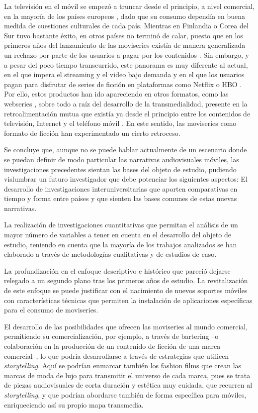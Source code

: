 \documentclass[spanish]{textolivre}
\begin{document}
La televisión en el móvil se empezó a truncar desde el principio, a nivel comercial, en la mayoría de los países europeos \cite{feijoo2010}, dado que su consumo dependía en buena medida de cuestiones culturales de cada país. Mientras en Finlandia o Corea del Sur tuvo bastante éxito, en otros países no terminó de calar, puesto que en los primeros años del lanzamiento de las moviseries existía de manera generalizada un rechazo por parte de los usuarios a pagar por los contenidos \cite{saez2010, urban2007}. Sin embargo, y a pesar del poco tiempo transcurrido, este panorama es muy diferente al actual, en el que impera el streaming y el video bajo demanda y en el que los usuarios pagan para disfrutar de series de ficción en plataformas como Netflix o HBO \cite{rayabravo2018}. Por ello, estos productos han ido apareciendo en otros formatos, como las webseries \cite{montoyabermudez2016}, sobre todo a raíz del desarrollo de la transmedialidad, presente en la retroalimentación mutua que existía ya desde el principio entre los contenidos de televisión, Internet y el teléfono móvil \cite{saez2010}. En este sentido, las moviseries como formato de ficción han experimentado un cierto retroceso. 

Se concluye que, aunque no se puede hablar actualmente de un escenario donde se puedan definir de modo particular las narrativas audiovisuales móviles, las investigaciones precedentes sientan las bases del objeto de estudio, pudiendo vislumbrar un futuro investigador que debe potenciar los siguientes aspectos: 
El desarrollo de investigaciones interuniversitarias que aporten comparativas en tiempo y forma entre países y que sienten las bases comunes de estas nuevas narrativas. 

La realización de investigaciones cuantitativas que permitan el análisis de un mayor número de variables a tener en cuenta en el desarrollo del objeto de estudio, teniendo en cuenta que la mayoría de los trabajos analizados se han elaborado a través de metodologías cualitativas y de estudios de caso.  

La profundización en el enfoque descriptivo e histórico que pareció dejarse relegado a un segundo plano tras los primeros años de estudio. La revitalización de este enfoque se puede justificar con el nacimiento de nuevos soportes móviles con características técnicas que permiten la instalación de aplicaciones específicas para el consumo de moviseries.

El desarrollo de las posibilidades que ofrecen las moviseries al mundo comercial, permitiendo su comercialización, por ejemplo, a través de bartering –o colaboración en la producción de un contenido de ficción de una marca comercial–, lo que podría desarrollarse a través de estrategias que utilicen \emph{storytelling}. Aquí se podrían enmarcar también los fashion films que crean las marcas de moda de lujo para transmitir el universo de cada marca, pues se trata de piezas audiovisuales de corta duración y estética muy cuidada, que recurren al \emph{storytelling}, y que podrían abordarse también de forma específica para móviles, enriqueciendo así su propio mapa transmedia. 
\end{document}
